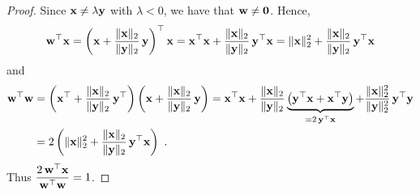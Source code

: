 \begin{proof}
Since $\mathbf{x} \neq \lambda \mathbf{y}$ with $\lambda < 0$, we have that
$\mathbf{w} \neq \mathbf{0}$.   Hence,
\[
\mathbf{w}^\top\mathbf{x} =
\left( \mathbf{x} + \frac{\|\mathbf{x}\|_2}{\|\mathbf{y}\|_2} \, \mathbf{y} \right)^\top
\mathbf{x}
= \mathbf{x}^\top \mathbf{x}
+ \frac{\|\mathbf{x}\|_2}{\|\mathbf{y}\|_2} \, \mathbf{y}^\top \mathbf{x}
= \|\mathbf{x}\|_2^2+ \frac{\|\mathbf{x}\|_2}{\|\mathbf{y}\|_2} \, \mathbf{y}^\top \mathbf{x}
\]
and
\begin{align*}
\mathbf{w}^\top\mathbf{w} &= 
\left(\mathbf{x}^\top + \frac{\|\mathbf{x}\|_2}{\|\mathbf{y}\|_2}\, \mathbf{y}^\top \right)
\left(\mathbf{x} + \frac{\|\mathbf{x}\|_2}{\|\mathbf{y}\|_2} \, \mathbf{y} \right)
= \mathbf{x}^\top \mathbf{x} + \frac{\|\mathbf{x}\|_2}{\|\mathbf{y}\|_2}
\underbrace{\left( \mathbf{y}^\top\mathbf{x} + \mathbf{x}^\top\mathbf{y} \right)
}_{= 2\, \mathbf{y}^\top\mathbf{x}}
+ \frac{\|\mathbf{x}\|_2^2}{\|\mathbf{y}\|_2^2} \, \mathbf{y}^\top \mathbf{y} \\
&= 2 \left( \|\mathbf{x}\|_2^2 +
\frac{\|\mathbf{x}\|_2}{\|\mathbf{y}\|_2}\, \mathbf{y}^\top\mathbf{x}\right) \ .
\end{align*}
Thus $\displaystyle \frac{2\,\mathbf{w}^\top \mathbf{x}}{\mathbf{w}^\top\mathbf{w}} = 1$.
\end{proof}

